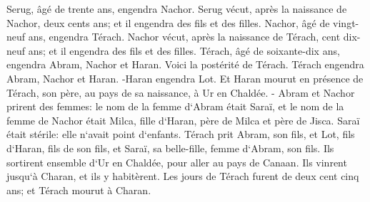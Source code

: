 \verse Serug, âgé de trente ans, engendra Nachor. 
\verse Serug vécut, après la naissance de Nachor, deux cents ans; et il engendra des fils et des filles. 
\verse Nachor, âgé de vingt-neuf ans, engendra Térach. 
\verse Nachor vécut, après la naissance de Térach, cent dix-neuf ans; et il engendra des fils et des filles. 
\verse Térach, âgé de soixante-dix ans, engendra Abram, Nachor et Haran. 
\verse Voici la postérité de Térach. Térach engendra Abram, Nachor et Haran. -Haran engendra Lot. 
\verse Et Haran mourut en présence de Térach, son père, au pays de sa naissance, à Ur en Chaldée. - 
\verse Abram et Nachor prirent des femmes: le nom de la femme d`Abram était Saraï, et le nom de la femme de Nachor était Milca, fille d`Haran, père de Milca et père de Jisca. 
\verse Saraï était stérile: elle n`avait point d`enfants. 
\verse Térach prit Abram, son fils, et Lot, fils d`Haran, fils de son fils, et Saraï, sa belle-fille, femme d`Abram, son fils. Ils sortirent ensemble d`Ur en Chaldée, pour aller au pays de Canaan. Ils vinrent jusqu`à Charan, et ils y habitèrent. 
\verse Les jours de Térach furent de deux cent cinq ans; et Térach mourut à Charan. 

